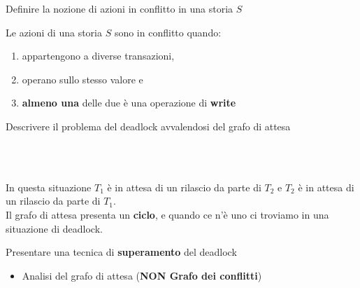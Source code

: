 \documentclass{exam}
\begin{document}
\begin{questions}
\begin{solution}
    \end{solution}
    \question Definire la nozione di azioni in conflitto in una storia $S$
    \begin{solution}
        Le azioni di una storia $S$ sono in conflitto quando:
        \begin{enumerate}
            \item appartengono a diverse transazioni,
            \item operano sullo stesso valore e
            \item \textbf{almeno una} delle due è una operazione di \textbf{write}
        \end{enumerate}
    \end{solution}
    \question Descrivere il problema del deadlock avvalendosi del grafo di attesa
    \begin{solution}\\
            \\
            In questa situazione $T_1$ è in attesa di un rilascio da parte di $T_2$ e $T_2$ è in attesa di un rilascio da parte di $T_1$.\\
            Il grafo di attesa presenta un \textbf{ciclo}, e quando ce n'è uno ci troviamo in una situazione di deadlock.
    \end{solution}
    \question Presentare una tecnica di \textbf{superamento} del deadlock
    \begin{solution}
        \begin{itemize}
            \item Analisi del grafo di attesa (\textbf{NON Grafo dei conflitti})\\
\end{itemize}
\end{solution}
\end{questions}
\end{document}
